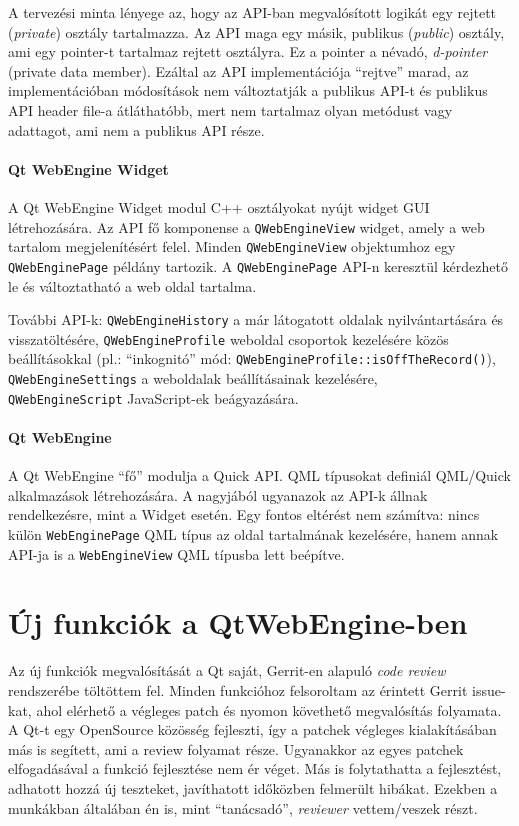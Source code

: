 \documentclass[12pt]{report}
\begin{document}
A tervezési minta lényege az, hogy az API-ban megvalósított logikát egy rejtett
(\textit{private}) osztály tartalmazza. Az API maga egy másik, publikus (\textit{public})
osztály, ami egy pointer-t tartalmaz rejtett osztályra. Ez a pointer a névadó,
\textit{d-pointer} (private data member). Ezáltal az API implementációja ``rejtve'' marad,
az implementációban módosítások nem változtatják a publikus API-t és publikus API header
file-a átláthatóbb, mert nem tartalmaz olyan metódust vagy adattagot, ami nem a publikus
API része.
\cite{bib:qt-wiki-d-pointer}

\subsubsection{Qt WebEngine Widget}
A Qt WebEngine Widget modul C++ osztályokat nyújt widget GUI létrehozására. Az API
fő komponense a \texttt{QWebEngineView} widget, amely a web tartalom megjelenítésért felel.
Minden \texttt{QWebEngineView} objektumhoz egy \texttt{QWebEnginePage} példány tartozik.
A \texttt{QWebEnginePage} API-n keresztül kérdezhető le és változtatható a web oldal
tartalma.

További API-k: \texttt{QWebEngineHistory} a már látogatott oldalak nyilvántartására és
visszatöltésére, \texttt{QWebEngineProfile} weboldal csoportok kezelésére közös
beállításokkal (pl.: ``inkognitó'' mód: \texttt{QWebEngineProfile::isOffTheRecord()}),
\texttt{QWebEngineSettings} a weboldalak beállításainak kezelésére, \\
\texttt{QWebEngineScript} JavaScript-ek beágyazására.

\subsubsection{Qt WebEngine}
A Qt WebEngine ``fő'' modulja a Quick API. QML típusokat definiál QML/Quick alkalmazások
létrehozására. A nagyjából ugyanazok az API-k állnak rendelkezésre, mint a Widget esetén.
Egy fontos eltérést nem számítva: nincs külön \texttt{WebEnginePage} QML típus az oldal
tartalmának kezelésére, hanem annak API-ja is a \texttt{WebEngineView} QML típusba lett
beépítve.


\chapter{Új funkciók a QtWebEngine-ben}
\label{chap:features}

Az új funkciók megvalósítását a Qt saját, Gerrit-en alapuló \textit{code review} rendszerébe
töltöttem fel. Minden funkcióhoz felsoroltam az érintett Gerrit issue-kat, ahol elérhető
a végleges patch és nyomon követhető megvalósítás folyamata. A Qt-t egy OpenSource
közösség fejleszti, így a patchek végleges kialakításában más is segített, ami a review
folyamat része. Ugyanakkor az egyes patchek elfogadásával a funkció fejlesztése nem
ér véget. Más is folytathatta a fejlesztést, adhatott hozzá új teszteket, javíthatott
időközben felmerült hibákat. Ezekben a munkákban általában én is, mint ``tanácsadó'',
\textit{reviewer} vettem/veszek részt.
\end{document}
